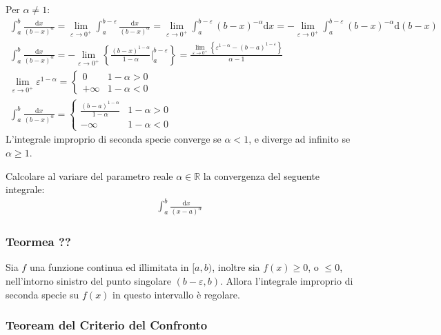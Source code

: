 \documentclass{article}
\numberwithin{equation}{subsection}
\begin{document}
Per $\alpha\neq1$:
\begin{gather*}
    \displaystyle\int_a^b\frac{\mathrm{d}x}{(b-x)^\alpha}=
    \lim_{\varepsilon\to0^+}\displaystyle\int_a^{b-\varepsilon}\frac{\mathrm{d}x}{(b-x)^{\alpha}}=
    \lim_{\varepsilon\to0^+}\displaystyle\int_a^{b-\varepsilon}(b-x)^{-\alpha}\mathrm{d}x=
    -\lim_{\varepsilon\to0^+}\int_a^{b-\varepsilon}(b-x)^{-\alpha}\mathrm{d}(b-x)\\
    \displaystyle\int_a^b\frac{\mathrm{d}x}{(b-x)^\alpha}=
    -\lim_{\varepsilon\to0^+}\left\{\frac{(b-x)^{1-\alpha}}{1-\alpha}\bigg|_a^{b-\varepsilon}\right\}=
    \frac{\lim_{\varepsilon\to0^+}\left\{\varepsilon^{1-\alpha}-(b-a)^{1-\varepsilon}\right\}}{\alpha-1}\\
    \lim_{\varepsilon\to0^+}\varepsilon^{1-\alpha}=\begin{cases}
        0&1-\alpha>0\\
        +\infty&1-\alpha<0
    \end{cases}\\
    \displaystyle\int_a^b\frac{\mathrm{d}x}{(b-x)^\alpha}=\begin{cases}
        \displaystyle\frac{(b-a)^{1-\alpha}}{1-\alpha}&1-\alpha>0\\
        -\infty&1-\alpha<0
    \end{cases}
\end{gather*}
L'integrale improprio di seconda specie converge se $\alpha<1$, e diverge ad infinito se $\alpha\geq1$. 

Calcolare al variare del parametro reale $\alpha\in\mathbb{R}$ la convergenza del seguente integrale:
\begin{gather*}
\displaystyle\int_a^b\frac{\mathrm{d}x}{(x-a)^\alpha}    
\end{gather*}


\subsubsection{Teormea ??} %

Sia $f$ una funzione continua ed illimitata in $[a,b)$, inoltre sia $f(x)\geq0$, o $\leq0$, nell'intorno sinistro del punto singolare $(b-\varepsilon, b)$. Allora l'integrale improprio di seconda specie su $f(x)$ in questo intervallo è regolare. 

\subsubsection{Teoream del Criterio del Confronto}
\end{document}
